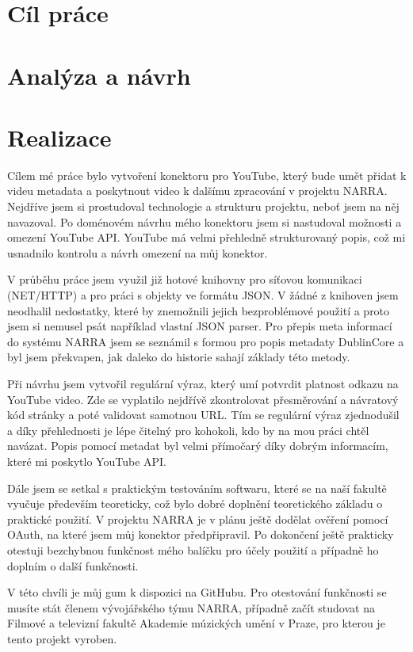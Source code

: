 \documentclass[thesis=B,czech]{FITthesis}[2012/06/26]
\begin{document}
\chapter{Cíl práce}
	
\chapter{Analýza a návrh}
	
	
	
	
	
	
	
\chapter{Realizace}
	
	
\begin{conclusion}
	\par Cílem mé práce bylo vytvoření konektoru pro YouTube, který bude umět přidat k videu metadata a poskytnout video k dalšímu zpracování v projektu NARRA. Nejdříve jsem si prostudoval technologie a strukturu projektu, neboť jsem na něj navazoval. Po doménovém návrhu mého konektoru jsem si nastudoval možnosti a omezení YouTube API. YouTube má velmi přehledně strukturovaný popis, což mi usnadnilo kontrolu a návrh omezení na můj konektor.
	\par V průběhu práce jsem využil již hotové knihovny pro síťovou komunikaci (NET/HTTP) a pro práci s objekty ve formátu JSON. V žádné z knihoven jsem neodhalil nedostatky, které by znemožnili jejich bezproblémové použití a proto jsem si nemusel psát například vlastní JSON parser. Pro přepis meta informací do systému NARRA jsem se seznámil s formou pro popis metadaty DublinCore a byl jsem překvapen, jak daleko do historie sahají základy této metody.
	\par Při návrhu jsem vytvořil regulární výraz, který umí potvrdit platnost odkazu na YouTube video. Zde se vyplatilo nejdřívě zkontrolovat přesměrování a návratový kód stránky a poté validovat samotnou URL. Tím se regulární výraz zjednodušil a díky přehlednosti je lépe čitelný pro kohokoli, kdo by na mou práci chtěl navázat. Popis pomocí metadat byl velmi přímočarý díky dobrým informacím, které mi poskytlo YouTube API.
	\par Dále jsem se setkal s praktickým testováním softwaru, které se na naší fakultě vyučuje především teoreticky, což bylo dobré doplnění teoretického základu o praktické použití. V projektu NARRA je v plánu ještě dodělat ověření pomocí OAuth, na které jsem můj konektor předpřipravil. Po dokončení ještě prakticky otestuji bezchybnou funkčnost mého balíčku pro účely použití a případně ho doplním o další funkčnosti.
	\par V této chvíli je můj gum k dispozici na GitHubu\cite{myself}. Pro otestování funkčnosti se musíte stát členem vývojářského týmu NARRA, případně začít studovat na Filmové a televizní fakultě Akademie múzických umění v Praze, pro kterou je tento projekt vyroben.

\end{conclusion}
\end{document}
